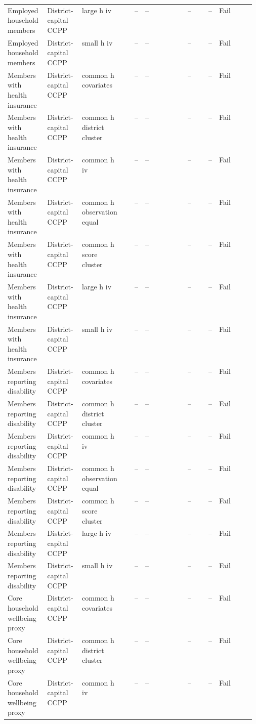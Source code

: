 \begin{longtable}{@{}p{0.16\linewidth}p{0.14\linewidth}p{0.14\linewidth}rp{0.13\linewidth}rrl@{}}
Employed household members & District-capital CCPP & large h iv & -- & -- & -- & -- & Fail \\
Employed household members & District-capital CCPP & small h iv & -- & -- & -- & -- & Fail \\
Members with health insurance & District-capital CCPP & common h covariates & -- & -- & -- & -- & Fail \\
Members with health insurance & District-capital CCPP & common h district cluster & -- & -- & -- & -- & Fail \\
Members with health insurance & District-capital CCPP & common h iv & -- & -- & -- & -- & Fail \\
Members with health insurance & District-capital CCPP & common h observation equal & -- & -- & -- & -- & Fail \\
Members with health insurance & District-capital CCPP & common h score cluster & -- & -- & -- & -- & Fail \\
Members with health insurance & District-capital CCPP & large h iv & -- & -- & -- & -- & Fail \\
Members with health insurance & District-capital CCPP & small h iv & -- & -- & -- & -- & Fail \\
Members reporting disability & District-capital CCPP & common h covariates & -- & -- & -- & -- & Fail \\
Members reporting disability & District-capital CCPP & common h district cluster & -- & -- & -- & -- & Fail \\
Members reporting disability & District-capital CCPP & common h iv & -- & -- & -- & -- & Fail \\
Members reporting disability & District-capital CCPP & common h observation equal & -- & -- & -- & -- & Fail \\
Members reporting disability & District-capital CCPP & common h score cluster & -- & -- & -- & -- & Fail \\
Members reporting disability & District-capital CCPP & large h iv & -- & -- & -- & -- & Fail \\
Members reporting disability & District-capital CCPP & small h iv & -- & -- & -- & -- & Fail \\
Core household wellbeing proxy & District-capital CCPP & common h covariates & -- & -- & -- & -- & Fail \\
Core household wellbeing proxy & District-capital CCPP & common h district cluster & -- & -- & -- & -- & Fail \\
Core household wellbeing proxy & District-capital CCPP & common h iv & -- & -- & -- & -- & Fail \\

\end{longtable}
